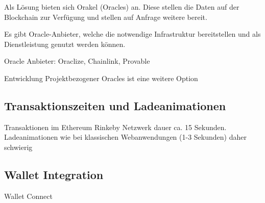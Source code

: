 Als Lösung bieten sich Orakel (Oracles) an. Diese stellen die Daten auf der Blockchain zur Verfügung und stellen auf Anfrage weitere bereit.

Es gibt Oracle-Anbieter, welche die notwendige Infrastruktur bereitstellen und als Dienstleistung genutzt werden können.

Oracle Anbieter: Oraclize, Chainlink, Provable

Entwicklung Projektbezogener Oracles ist eine weitere Option


\subsection*{Transaktionszeiten und Ladeanimationen}
Transaktionen im Ethereum Rinkeby Netzwerk dauer ca. 15 Sekunden. 
Ladeanimationen wie bei klassischen Webanwendungen (1-3 Sekunden) daher schwierig


\subsection*{Wallet Integration}
Wallet Connect